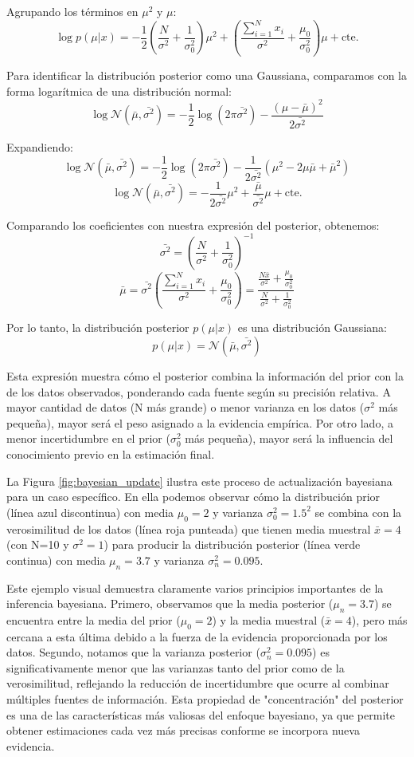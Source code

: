 Agrupando los términos en \(\mu^2\) y \(\mu\):
\[\log p(\mu|x)=-\frac{1}{2}\left(\frac{N}{\sigma^2}+\frac{1}{\sigma_{0}^2}\right)\mu^2+\left(\frac{\sum_{i=1}^{N}x_i}{\sigma^2}+\frac{\mu_0}{\sigma_0^2}\right)\mu+\text{cte.}\]

Para identificar la distribución posterior como una Gaussiana, comparamos con la forma logarítmica de una distribución normal:
\[\log \mathcal{N}(\bar{\mu},\bar{\sigma^2}) = -\frac{1}{2}\log(2\pi\bar{\sigma^2}) - \frac{(\mu-\bar{\mu})^2}{2\bar{\sigma^2}}\]

Expandiendo:
\[\log \mathcal{N}(\bar{\mu},\bar{\sigma^2}) = -\frac{1}{2}\log(2\pi\bar{\sigma^2}) - \frac{1}{2\bar{\sigma^2}}(\mu^2 - 2\mu\bar{\mu} + \bar{\mu}^2)\]
\[\log \mathcal{N}(\bar{\mu},\bar{\sigma^2}) = -\frac{1}{2\bar{\sigma^2}}\mu^2 + \frac{\bar{\mu}}{\bar{\sigma^2}}\mu + \text{cte.}\]

Comparando los coeficientes con nuestra expresión del posterior, obtenemos:
\[\bar{\sigma^2} = \left(\frac{N}{\sigma^2} + \frac{1}{\sigma_0^2}\right)^{-1}\]
\[\bar{\mu} = \bar{\sigma^2}\left(\frac{\sum_{i=1}^{N}x_i}{\sigma^2} + \frac{\mu_0}{\sigma_0^2}\right) = \frac{\frac{N\bar{x}}{\sigma^2} + \frac{\mu_0}{\sigma_0^2}}{\frac{N}{\sigma^2} + \frac{1}{\sigma_0^2}}\]

Por lo tanto, la distribución posterior \(p(\mu|x)\) es una distribución Gaussiana:
\[p(\mu|x) = \mathcal{N}(\bar{\mu}, \bar{\sigma^2})\]

Esta expresión muestra cómo el posterior combina la información del prior con la de los datos observados, ponderando cada fuente según su precisión relativa. A mayor cantidad de datos (N más grande) o menor varianza en los datos ($\sigma^2$ más pequeña), mayor será el peso asignado a la evidencia empírica. Por otro lado, a menor incertidumbre en el prior ($\sigma_0^2$ más pequeña), mayor será la influencia del conocimiento previo en la estimación final.

La Figura \ref{fig:bayesian_update} ilustra este proceso de actualización bayesiana para un caso específico. En ella podemos observar cómo la distribución prior (línea azul discontinua) con media $\mu_0=2$ y varianza $\sigma_0^2=1.5^2$ se combina con la verosimilitud de los datos (línea roja punteada) que tienen media muestral $\bar{x}=4$ (con N=10 y $\sigma^2=1$) para producir la distribución posterior (línea verde continua) con media $\mu_n=3.7$ y varianza $\sigma_n^2=0.095$.

Este ejemplo visual demuestra claramente varios principios importantes de la inferencia bayesiana. Primero, observamos que la media posterior ($\mu_n=3.7$) se encuentra entre la media del prior ($\mu_0=2$) y la media muestral ($\bar{x}=4$), pero más cercana a esta última debido a la fuerza de la evidencia proporcionada por los datos. Segundo, notamos que la varianza posterior ($\sigma_n^2=0.095$) es significativamente menor que las varianzas tanto del prior como de la verosimilitud, reflejando la reducción de incertidumbre que ocurre al combinar múltiples fuentes de información. Esta propiedad de "concentración" del posterior es una de las características más valiosas del enfoque bayesiano, ya que permite obtener estimaciones cada vez más precisas conforme se incorpora nueva evidencia.

